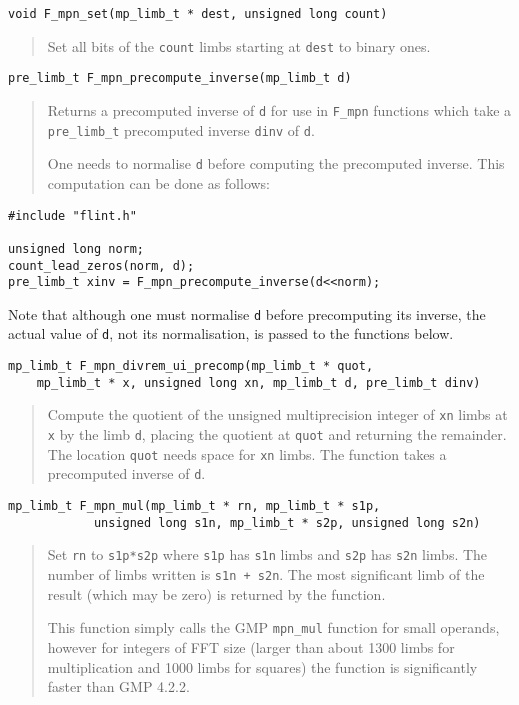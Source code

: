 \documentclass[a4paper,10pt]{article}
\newcommand{\code}{\lstinline}
\begin{document}
\begin{lstlisting}
void F_mpn_set(mp_limb_t * dest, unsigned long count)
\end{lstlisting}
\begin{quote}
Set all bits of the \code{count} limbs starting at \code{dest} to binary ones.
\end{quote}

\begin{lstlisting}
pre_limb_t F_mpn_precompute_inverse(mp_limb_t d)                  
\end{lstlisting}
\begin{quote}
Returns a precomputed inverse of \code{d} for use in \code{F_mpn} functions which take a \code{pre_limb_t} precomputed inverse \code{dinv} of \code{d}. 

One needs to normalise \code{d} before computing the precomputed inverse. This computation can be done as follows:
\end{quote}

\begin{lstlisting}
#include "flint.h"

unsigned long norm;
count_lead_zeros(norm, d);
pre_limb_t xinv = F_mpn_precompute_inverse(d<<norm);
\end{lstlisting}

Note that although one must normalise \code{d} before precomputing its inverse, the actual value of \code{d}, not its normalisation, is passed to the functions below.

\begin{lstlisting}
mp_limb_t F_mpn_divrem_ui_precomp(mp_limb_t * quot, 
    mp_limb_t * x, unsigned long xn, mp_limb_t d, pre_limb_t dinv)
\end{lstlisting}
\begin{quote}
Compute the quotient of the unsigned multiprecision integer of \code{xn} limbs at \code{x} by the limb \code{d}, placing the quotient at \code{quot} and returning the remainder. The location \code{quot} needs space for \code{xn} limbs. The function takes a precomputed inverse of \code{d}.
\end{quote}
             
\begin{lstlisting}
mp_limb_t F_mpn_mul(mp_limb_t * rn, mp_limb_t * s1p, 
            unsigned long s1n, mp_limb_t * s2p, unsigned long s2n)
\end{lstlisting}
\begin{quote}
Set \code{rn} to \code{s1p*s2p} where \code{s1p} has \code{s1n} limbs and \code{s2p} has \code{s2n} limbs. The number of limbs written is \code{s1n + s2n}. The most significant limb of the result (which may be zero) is returned by the function.

This function simply calls the GMP \code{mpn_mul} function for small operands, however for integers of FFT size (larger than about 1300 limbs for multiplication and 1000 limbs for squares) the function is significantly faster than GMP 4.2.2.
\end{quote}
                                      
\end{document}
